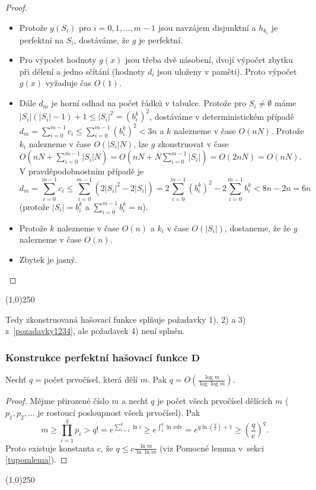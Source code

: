\documentclass[a4paper,12pt]{article}
\newenvironment{pitemize}{
 \begin{itemize}
   \setlength{\itemsep}{1pt}
   \setlength{\parskip}{0pt}
   \setlength{\parsep}{0pt}
 }{\end{itemize}}
\newenvironment{myproof}{
  \begin{proof}
    
  }{
  \end{proof}
  \begin{center}
   \line(1,0){250}
   \end{center}
  }
\begin{document}
\begin{myproof}
    \begin{pitemize}
        \item Protože $g(S_i)$ pro $i=0,1,\dots,m-1$ 
jsou navzájem disjunktní a $h_{k_i}$ je perfektní na $S_
i$, 
dostáváme, že $g$ je perfektní. 
 \item Pro výpočet hodnoty $
g(x)$ 
jsou třeba dvě násobení, dvojí výpočet zbytku při 
dělení a jedno sčítání (hodnoty $d_i$ jsou uloženy v 
paměti). Proto výpočet $g(x)$ vyžaduje čas $O(1)$. 
 \item Dále 
$d_m$ je horní odhad na počet řádků v tabulce. 
Protože pro $S_i\ne\emptyset$ máme $|S_i|(|S_i|-1)+1\le |S_
i|^2=(b_i^k)^2$, 
dostáváme v deterministickém případě 
$d_m=\sum_{i=0}^{m-1}c_i\le\sum_{i=0}^{m-1}(b_i^k)^2<3n$ a $k$ nalezneme v čase 
$O(nN)$. Protože $k_i$ nalezneme v čase $O(|S_i|N)$, lze $g$ 
zkonstruovat v čase 
$O(nN+\sum_{i=0}^{m-1}|S_i|N)=O(nN+N\sum_{i=0}^{m-1}|S_i|)=O(2nN)
=O(nN)$. 
V pravděpodob\-nostním případě je 
$$d_m=\sum_{i=0}^{m-1}c_i\le\sum_{i=0}^{m-1}(2|S_i|^2-2|S_i|)=2\sum_{
i=0}^{m-1}(b_i^k)^2-2\sum_{i=0}^{m-1}b_i^k<8n-2n=6n$$
(protože $|S_i|=b_i^k$ a $\sum_{i=0}^{m-1}b_i^k=n$). 
 \item Protože $
k$ nalezneme v čase $O(n)$ a $k_i$ v čase $O(|S_i|)$, dostaneme, že 
že $g$ nalezneme v čase $O(n)$. 
 \item Zbytek je jasný.
\end{pitemize}
\end{myproof}

Tedy zkonstruovaná hašovací funkce splňuje požadavky 
1), 2) a 3) z~\ref{pozadavky1234}, ale požadavek 4) není splněn. 

\subsubsection{Konstrukce perfektní hašovací funkce $\mathbf{D}$}

\begin{lemma}Nechť $q=$počet prvočísel, která dělí 
$m$. Pak $q=O(\frac {\log m}{\log\log m})$.
\end{lemma}

\begin{myproof}

Mějme přirozené číslo $m$ a nechť $q$ je počet všech prvočísel 
dělících $m$ ($p_1,p_2,\dots$ je rostoucí posloupnost všech 
prvočísel). Pak
$$m\ge\prod_{i=1}^qp_i>q!=e^{\sum_{i=1}^q\ln i}\ge e^{\int_1^q\ln 
xdx}=e^{q\ln(\frac qe)+1}\ge (\frac qe)^q.$$
Proto existuje konstanta $c$, že $q\le c\frac {\ln m}{\ln\ln m}$ (viz Pomocné lemma v~sekci \ref{tupomlema}). 
\end{myproof}
\end{document}
